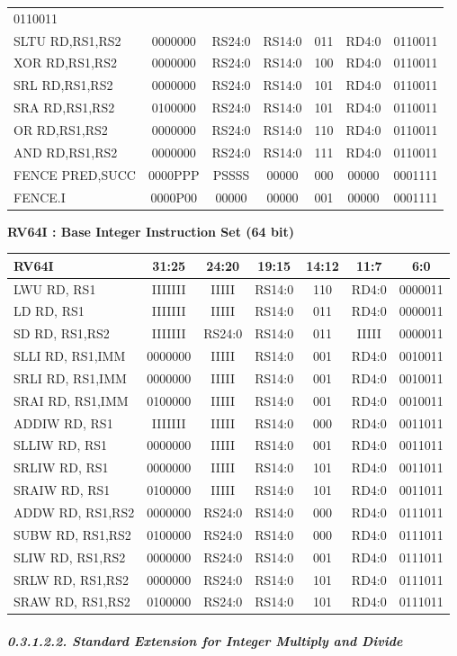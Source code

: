 \documentclass[
]{article}
\begin{document}
\begin{longtable}[]{@{}lcccccc@{}}
0110011\tabularnewline
SLTU RD,RS1,RS2 & 0000000 & RS24:0 & RS14:0 & 011 & RD4:0 &
0110011\tabularnewline
XOR RD,RS1,RS2 & 0000000 & RS24:0 & RS14:0 & 100 & RD4:0 &
0110011\tabularnewline
SRL RD,RS1,RS2 & 0000000 & RS24:0 & RS14:0 & 101 & RD4:0 &
0110011\tabularnewline
SRA RD,RS1,RS2 & 0100000 & RS24:0 & RS14:0 & 101 & RD4:0 &
0110011\tabularnewline
OR RD,RS1,RS2 & 0000000 & RS24:0 & RS14:0 & 110 & RD4:0 &
0110011\tabularnewline
AND RD,RS1,RS2 & 0000000 & RS24:0 & RS14:0 & 111 & RD4:0 &
0110011\tabularnewline
FENCE PRED,SUCC & 0000PPP & PSSSS & 00000 & 000 & 00000 &
0001111\tabularnewline
FENCE.I & 0000P00 & 00000 & 00000 & 001 & 00000 & 0001111\tabularnewline
\bottomrule
\end{longtable}

\textbf{RV64I : Base Integer Instruction Set (64 bit)}

\begin{longtable}[]{@{}lcccccc@{}}
\toprule
RV64I & 31:25 & 24:20 & 19:15 & 14:12 & 11:7 & 6:0\tabularnewline
\midrule
\endhead
LWU RD, RS1 & IIIIIII & IIIII & RS14:0 & 110 & RD4:0 &
0000011\tabularnewline
LD RD, RS1 & IIIIIII & IIIII & RS14:0 & 011 & RD4:0 &
0000011\tabularnewline
SD RD, RS1,RS2 & IIIIIII & RS24:0 & RS14:0 & 011 & IIIII &
0000011\tabularnewline
SLLI RD, RS1,IMM & 0000000 & IIIII & RS14:0 & 001 & RD4:0 &
0010011\tabularnewline
SRLI RD, RS1,IMM & 0000000 & IIIII & RS14:0 & 001 & RD4:0 &
0010011\tabularnewline
SRAI RD, RS1,IMM & 0100000 & IIIII & RS14:0 & 001 & RD4:0 &
0010011\tabularnewline
ADDIW RD, RS1 & IIIIIII & IIIII & RS14:0 & 000 & RD4:0 &
0011011\tabularnewline
SLLIW RD, RS1 & 0000000 & IIIII & RS14:0 & 001 & RD4:0 &
0011011\tabularnewline
SRLIW RD, RS1 & 0000000 & IIIII & RS14:0 & 101 & RD4:0 &
0011011\tabularnewline
SRAIW RD, RS1 & 0100000 & IIIII & RS14:0 & 101 & RD4:0 &
0011011\tabularnewline
ADDW RD, RS1,RS2 & 0000000 & RS24:0 & RS14:0 & 000 & RD4:0 &
0111011\tabularnewline
SUBW RD, RS1,RS2 & 0100000 & RS24:0 & RS14:0 & 000 & RD4:0 &
0111011\tabularnewline
SLIW RD, RS1,RS2 & 0000000 & RS24:0 & RS14:0 & 001 & RD4:0 &
0111011\tabularnewline
SRLW RD, RS1,RS2 & 0000000 & RS24:0 & RS14:0 & 101 & RD4:0 &
0111011\tabularnewline
SRAW RD, RS1,RS2 & 0100000 & RS24:0 & RS14:0 & 101 & RD4:0 &
0111011\tabularnewline
\bottomrule
\end{longtable}

\hypertarget{standard-extension-for-integer-multiply-and-divide}{%
\subparagraph{0.3.1.2.2. Standard Extension for Integer Multiply and
Divide}\label{standard-extension-for-integer-multiply-and-divide}}
\end{document}
